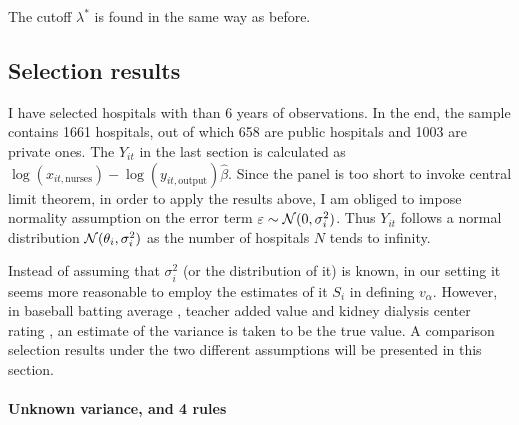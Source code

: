 \documentclass[12pt]{article}
\begin{document}
The cutoff $\lambda^*$ is found in the same way as before.

\subsection{Selection results}
I have selected hospitals with than 6 years of observations. In the end, the
sample contains 1661 hospitals, out of which 658 are public hospitals and 1003
are private ones. The $Y_{it}$ in the last section is calculated as $
    \log(x_{it,\text{nurses}}) - \log(y_{it,\text{output}})\hat{\beta}$. Since the
panel is too short to invoke central limit theorem, in order to apply the
results above, I am obliged to impose normality assumption on the error term
$\varepsilon \sim \mathcal{N}(0,\sigma_i^2)$. Thus $Y_{it}$ follows a normal
distribution $\mathcal{N}(\theta_i,\sigma_i^2)$ as the number of hospitals $N$ tends
to infinity.

Instead of assuming that $\sigma_i^2$ (or the distribution of it) is known, in
our setting it seems more reasonable to employ the estimates of it $S_i$ in
defining $v_\alpha$. However, in baseball batting average
\citep{gu2017empirical}, teacher added value \citep{gilraine2020new} and kidney
dialysis center rating \citep{gu2023invidious}, an estimate of the variance is
taken to be the true value. A comparison selection results under the two
different assumptions will be presented in this section.
\paragraph{Unknown variance, and 4 rules}
\end{document}
